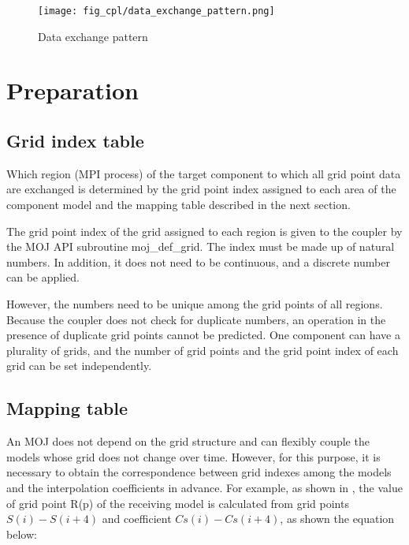 \begin{figure}
\hypertarget{fig:data_exchange_pattern}{%
\centering
\texttt{[image: fig\_cpl/data\_exchange\_pattern.png]}
\caption{Data exchange pattern}\label{fig:data_exchange_pattern}
}
\end{figure}

\hypertarget{preparation}{%
\section{Preparation}\label{preparation}}

\hypertarget{grid-index-table}{%
\subsection{Grid index table}\label{grid-index-table}}

Which region (MPI process) of the target component to which all grid
point data are exchanged is determined by the grid point index assigned
to each area of the component model and the mapping table described in
the next section.

The grid point index of the grid assigned to each region is given to the
coupler by the MOJ API subroutine moj\_def\_grid. The index must be made
up of natural numbers. In addition, it does not need to be continuous,
and a discrete number can be applied.

However, the numbers need to be unique among the grid points of all
regions. Because the coupler does not check for duplicate numbers, an
operation in the presence of duplicate grid points cannot be predicted.
One component can have a plurality of grids, and the number of grid
points and the grid point index of each grid can be set independently.

\hypertarget{mapping-table}{%
\subsection{Mapping table}\label{mapping-table}}

An MOJ does not depend on the grid structure and can flexibly couple the
models whose grid does not change over time. However, for this purpose,
it is necessary to obtain the correspondence between grid indexes among
the models and the interpolation coefficients in advance. For example,
as shown in , the value of grid point R(p) of the receiving model is
calculated from grid points \(S(i)-S(i+4)\) and coefficient
\(Cs(i)-Cs(i+4)\), as shown the equation below:

